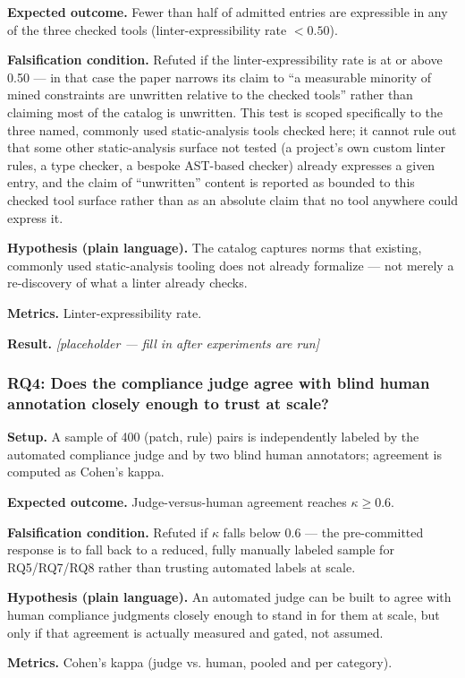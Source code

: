 \documentclass[11pt]{article}
\newcommand{\ph}{\textit{[placeholder --- fill in after experiments are run]}}
\begin{document}
\textbf{Expected outcome.} Fewer than half of admitted entries are expressible in any of the three checked tools (linter-expressibility rate $< 0.50$).

\textbf{Falsification condition.} Refuted if the linter-expressibility rate is at or above 0.50 --- in that case the paper narrows its claim to ``a measurable minority of mined constraints are unwritten relative to the checked tools'' rather than claiming most of the catalog is unwritten. This test is scoped specifically to the three named, commonly used static-analysis tools checked here; it cannot rule out that some other static-analysis surface not tested (a project's own custom linter rules, a type checker, a bespoke AST-based checker) already expresses a given entry, and the claim of ``unwritten'' content is reported as bounded to this checked tool surface rather than as an absolute claim that no tool anywhere could express it.

\textbf{Hypothesis (plain language).} The catalog captures norms that existing, commonly used static-analysis tooling does not already formalize --- not merely a re-discovery of what a linter already checks.

\textbf{Metrics.} Linter-expressibility rate.

\textbf{Result.} \ph

\subsubsection{RQ4: Does the compliance judge agree with blind human annotation closely enough to trust at scale?}
\textbf{Setup.} A sample of 400 (patch, rule) pairs is independently labeled by the automated compliance judge and by two blind human annotators; agreement is computed as Cohen's kappa.

\textbf{Expected outcome.} Judge-versus-human agreement reaches $\kappa \geq 0.6$.

\textbf{Falsification condition.} Refuted if $\kappa$ falls below 0.6 --- the pre-committed response is to fall back to a reduced, fully manually labeled sample for RQ5/RQ7/RQ8 rather than trusting automated labels at scale.

\textbf{Hypothesis (plain language).} An automated judge can be built to agree with human compliance judgments closely enough to stand in for them at scale, but only if that agreement is actually measured and gated, not assumed.

\textbf{Metrics.} Cohen's kappa (judge vs. human, pooled and per category).
\end{document}
